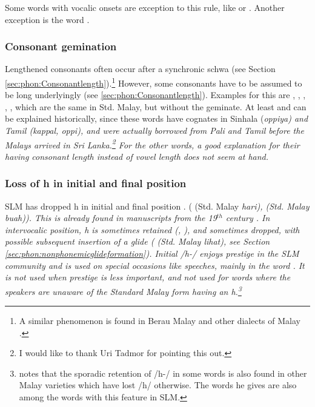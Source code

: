 Some words with vocalic onsets are exception to this rule, like  or . Another exception is the word .

\subsubsection{Consonant gemination}\label{sec:phon:hist:consonantgemination}
Lengthened consonants often occur after a synchronic schwa (see Section \ref{sec:phon:Consonantlength}).\footnote{A similar phenomenon is found in Berau Malay \citep{Collins1992Berau,Adelaar2005struct} and other dialects of Malay \citep[206]{Adelaar2005struct}.} However, some consonants have to be assumed to be long underlyingly (see \ref{sec:phon:Consonantlength}).  Examples for this are , , , , , which are the same in Std. Malay, but without the geminate. At least  and  can be explained historically, since these words have cognates in Sinhala (\em \dentt oppiya\em) and Tamil (\em kappal, \dentt oppi\em), and were actually borrowed from Pali and Tamil before the Malays arrived in Sri Lanka.\footnote{I would like to thank Uri Tadmor for pointing this out.} For the other words, a good explanation for their having consonant length instead of vowel length does not seem at hand.


\subsubsection[Loss of h]{Loss of h in initial and final position}
SLM has dropped h in  initial and final position \citep{Adelaar1991}. ( (Std. Malay \em hari\em),  (Std. Malay \em buah\em)). This is already found in manuscripts from the 19$^{th}$ century \citep[119]{Hussainmiya1987}. In intervocalic position, h is sometimes retained (, ), and sometimes dropped, with possible subsequent insertion of a glide ( (Std. Malay \em lihat\em), see Section \ref{sec:phon:nonphonemicglideformation}). Initial /h-/ enjoys prestige in the SLM community and is used on special occasions like speeches, mainly in the word . It is not used when prestige is less important, and not used for words where the speakers are unaware of the Standard Malay form having an h.\footnote{\citet[99]{Paauw2008phd} notes that the sporadic retention of /h-/ in some words is also found in other Malay varieties which have lost /h/ otherwise. The words he gives are also among the words with this feature in SLM.}

